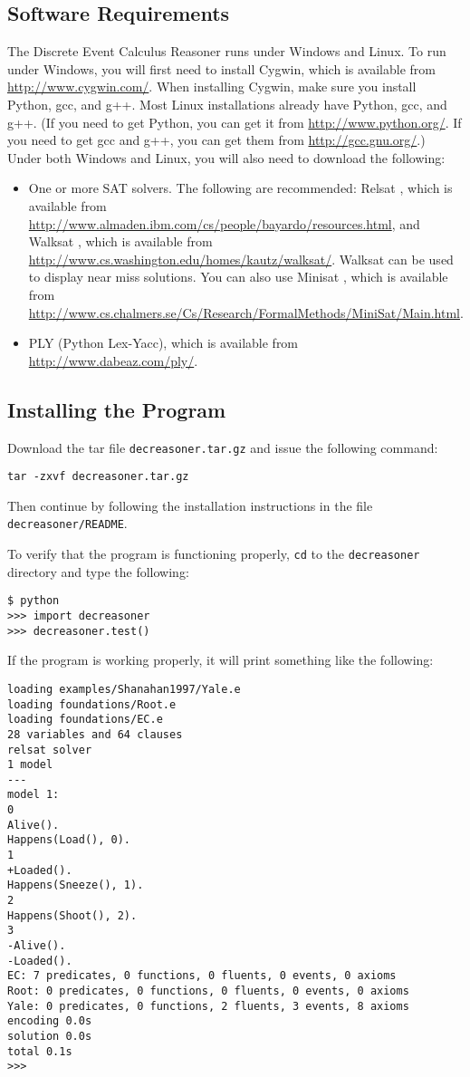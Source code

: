 \documentclass{article}
\begin{document}
\subsection{Software Requirements}

The Discrete Event Calculus Reasoner runs under Windows and Linux.
To run under Windows, you will first need to install Cygwin, which is
available from
\url{http://www.cygwin.com/}. When installing Cygwin, make sure you
install Python, gcc, and g++. Most Linux installations already have
Python, gcc, and g++. (If you need to get Python, you can get it from
\url{http://www.python.org/}. If you need to get gcc and g++, you can
get them from \url{http://gcc.gnu.org/}.) Under both Windows and
Linux, you will also need to download the following:
\begin{itemize}
\item
One or more SAT solvers. The following are recommended:
Relsat \cite{BayardoSchrag:1997},
which is available from
\url{http://www.almaden.ibm.com/cs/people/bayardo/resources.html},
and
Walksat \cite{SelmanKautzCohen:1993}, which is available from
\url{http://www.cs.washington.edu/homes/kautz/walksat/}.
Walksat can be used to display near miss solutions.
You can also use
Minisat \cite{EenSorensson:2004},
which is available from
\url{http://www.cs.chalmers.se/Cs/Research/FormalMethods/MiniSat/Main.html}.
\item
PLY (Python Lex-Yacc), which is available from
\url{http://www.dabeaz.com/ply/}.
\end{itemize}

\subsection{Installing the Program}

Download the tar file {\tt decreasoner.tar.gz} and
issue the following command:
\begin{verbatim}
tar -zxvf decreasoner.tar.gz
\end{verbatim}
Then continue by following the installation instructions in the file
{\tt decreasoner/README}.

To verify that the program is functioning properly, {\tt cd} to the
{\tt decreasoner} directory and type the following:
\begin{verbatim}
$ python
>>> import decreasoner
>>> decreasoner.test()
\end{verbatim}
If the program is working properly, it will print something like
the following:
\begin{verbatim}
loading examples/Shanahan1997/Yale.e
loading foundations/Root.e
loading foundations/EC.e
28 variables and 64 clauses
relsat solver
1 model
---
model 1:
0
Alive().
Happens(Load(), 0).
1
+Loaded().
Happens(Sneeze(), 1).
2
Happens(Shoot(), 2).
3
-Alive().
-Loaded().
EC: 7 predicates, 0 functions, 0 fluents, 0 events, 0 axioms
Root: 0 predicates, 0 functions, 0 fluents, 0 events, 0 axioms
Yale: 0 predicates, 0 functions, 2 fluents, 3 events, 8 axioms
encoding 0.0s
solution 0.0s
total 0.1s
>>>
\end{verbatim}
\end{document}
